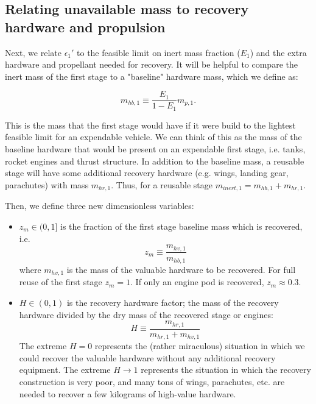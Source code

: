 \documentclass{iaf-iac}
\begin{document}
\begin{multicols}{2}
\subsection{Relating unavailable mass to recovery hardware and propulsion} \label{sec:unavail_mass_hardware_and_propulsion}
Next, we relate $\epsilon_1'$ to the feasible limit on inert mass fraction ($E_1$) and the extra hardware and propellant needed for recovery.
It will be helpful to compare the inert mass of the first stage to a "baseline" hardware mass, which we define as:

\begin{equation}
m_{hb,1} \equiv \frac{E_1}{1 - E_1} m_{p,1}.
\end{equation}

This is the mass that the first stage would have if it were build to the lightest feasible limit for an expendable vehicle. We can think of this as the mass of the baseline hardware that would be present on an expendable first stage, i.e. tanks, rocket engines and thrust structure. In addition to the baseline mass, a reusable stage will have some additional recovery hardware (e.g. wings, landing gear, parachutes) with mass $m_{hr,1}$. Thus, for a reusable stage $m_{inert,1} = m_{hb,1} + m_{hr,1}$.

Then, we define three new dimensionless variables:
\begin{itemize}
    \item $z_m \in (0, 1]$ is the fraction of the first stage baseline mass which is recovered, i.e.
    \begin{equation}
    z_m \equiv \frac{m_{hv,1}}{m_{hb,1}}
    \end{equation}
    where $m_{hv,1}$ is the mass of the valuable hardware to be recovered. For full reuse of the first stage $z_m = 1$. If only an engine pod is recovered, $z_m \approx 0.3$.

    \item $H \in (0, 1)$ is the recovery hardware factor; the mass of the recovery hardware divided by the dry mass of the recovered stage or engines:
    \begin{equation}
    H \equiv \frac{m_{hr,1}}{m_{hr,1} + m_{hv,1}}
    \end{equation}
    The extreme $H=0$ represents the (rather miraculous) situation in which we could recover the valuable hardware without any additional recovery equipment. The extreme $H \rightarrow 1$ represents the situation in which the recovery construction is very poor, and many tons of wings, parachutes, etc. are needed to recover a few kilograms of high-value hardware.


\end{itemize}
\end{multicols}
\end{document}
